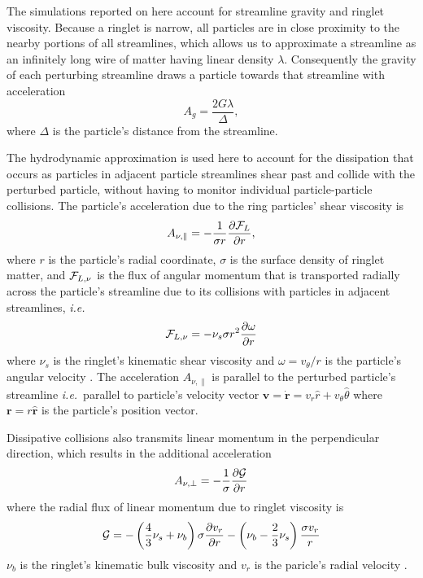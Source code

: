 \documentclass[preprint]{aastex62}
\begin{document}
The simulations reported on here account for streamline gravity
and ringlet viscosity. Because a ringlet is narrow, all particles
are in close proximity to the nearby portions of all streamlines,
which allows us to approximate a streamline as an infinitely
long wire of matter having linear density $\lambda$.
Consequently the gravity of each perturbing streamline draws a particle
towards that streamline with acceleration
\begin{equation}
\label{eqn:gravity}
    A_g=\frac{2G\lambda}{\Delta },
\end{equation}
where $\Delta$ is the particle's distance from the streamline.

The hydrodynamic approximation is used here to account for
the dissipation that occurs as particles in adjacent particle streamlines
shear past and collide with the perturbed particle,
without having to monitor individual particle-particle collisions.
The particle's acceleration due to the ring particles' shear viscosity is
\begin{equation}
\label{eqn:shear_viscosity}
    A_{\nu,\parallel}=-\frac{1}{\sigma r}\frac{\partial {\cal F}_L}{\partial r},
\end{equation}
where $r$ is the particle's radial coordinate, 
$\sigma$ is the surface density of ringlet matter, and 
${\cal F}_{L,\nu}$ is the flux of angular momentum
that is transported radially across the particle's streamline
due to its collisions with particles in adjacent streamlines, {\it i.e.}\
\begin{equation}
    \label{eqn:F_nu_theta}
    {\cal F}_{L,\nu} = -\nu_s \sigma r^2\frac{\partial\omega}{\partial r}
\end{equation}
where $\nu_s$ is the ringlet's kinematic shear viscosity
and $\omega=v_\theta/r$ is the particle's angular velocity \citep{HS13}.
The acceleration $A_{\nu,\parallel }$ is parallel to the perturbed particle's streamline
{\it i.e.}\ parallel to particle's velocity vector
$\mathbf{v}=\dot{\mathbf{r}}=v_r\hat{r} + v_\theta\hat{\theta}$ 
where $\mathbf{r} = r\hat{\mathbf{r}}$ is the particle's position vector.

Dissipative collisions also transmits linear momentum in the perpendicular direction,
which results in the additional acceleration
\begin{equation}
\label{eqn:bulk_viscosity}
    A_{\nu, \perp}=-\frac{1}{\sigma}\frac{\partial {\cal G}}{\partial r} 
\end{equation}
where the radial flux of linear momentum due to ringlet viscosity is
\begin{equation}
    \label{eqn:G}
    {\cal G} = -\left(\frac{4}{3}\nu_s + \nu_b\right)\sigma\frac{\partial v_r}{\partial r}
        -\left(\nu_b - \frac{2}{3}\nu_s\right)\frac{\sigma v_r}{r}
\end{equation}
$\nu_b$ is the ringlet's kinematic bulk viscosity and $v_r$ is the paricle's radial velocity
\citep{HS13}.
\end{document}

